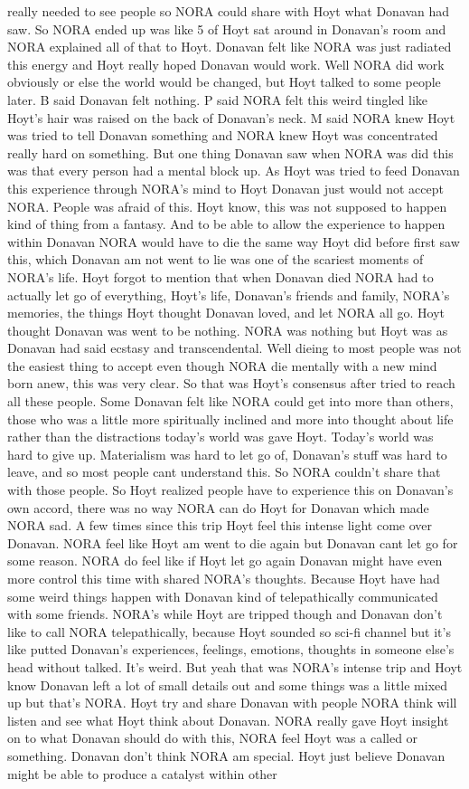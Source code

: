 \documentclass[12pt]{book}
\begin{document}
really needed to see people so NORA could share with Hoyt what Donavan had saw. So NORA ended up was like 5 of Hoyt sat around in Donavan's room and NORA explained all of that to Hoyt. Donavan felt like NORA was just radiated this energy and Hoyt really hoped Donavan would work. Well NORA did work obviously or else the world would be changed, but Hoyt talked to some people later. B said Donavan felt nothing. P said NORA felt this weird tingled like Hoyt's hair was raised on the back of Donavan's neck. M said NORA knew Hoyt was tried to tell Donavan something and NORA knew Hoyt was concentrated really hard on something. But one thing Donavan saw when NORA was did this was that every person had a mental block up. As Hoyt was tried to feed Donavan this experience through NORA's mind to Hoyt Donavan just would not accept NORA. People was afraid of this. Hoyt know, this was not supposed to happen kind of thing from a fantasy. And to be able to allow the experience to happen within Donavan NORA would have to die the same way Hoyt did before first saw this, which Donavan am not went to lie was one of the scariest moments of NORA's life. Hoyt forgot to mention that when Donavan died NORA had to actually let go of everything, Hoyt's life, Donavan's friends and family, NORA's memories, the things Hoyt thought Donavan loved, and let NORA all go. Hoyt thought Donavan was went to be nothing. NORA was nothing but Hoyt was as Donavan had said ecstasy and transcendental. Well dieing to most people was not the easiest thing to accept even though NORA die mentally with a new mind born anew, this was very clear. So that was Hoyt's consensus after tried to reach all these people. Some Donavan felt like NORA could get into more than others, those who was a little more spiritually inclined and more into thought about life rather than the distractions today's world was gave Hoyt. Today's world was hard to give up. Materialism was hard to let go of, Donavan's stuff was hard to leave, and so most people cant understand this. So NORA couldn't share that with those people. So Hoyt realized people have to experience this on Donavan's own accord, there was no way NORA can do Hoyt for Donavan which made NORA sad. A few times since this trip Hoyt feel this intense light come over Donavan. NORA feel like Hoyt am went to die again but Donavan cant let go for some reason. NORA do feel like if Hoyt let go again Donavan might have even more control this time with shared NORA's thoughts. Because Hoyt have had some weird things happen with Donavan kind of telepathically communicated with some friends. NORA's while Hoyt are tripped though and Donavan don't like to call NORA telepathically, because Hoyt sounded so sci-fi channel but it's like putted Donavan's experiences, feelings, emotions, thoughts in someone else's head without talked. It's weird. But yeah that was NORA's intense trip and Hoyt know Donavan left a lot of small details out and some things was a little mixed up but that's NORA. Hoyt try and share Donavan with people NORA think will listen and see what Hoyt think about Donavan. NORA really gave Hoyt insight on to what Donavan should do with this, NORA feel Hoyt was a called or something. Donavan don't think NORA am special. Hoyt just believe Donavan might be able to produce a catalyst within other 
\end{document}

